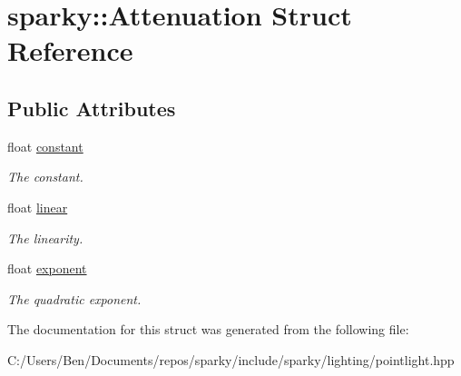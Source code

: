 \hypertarget{structsparky_1_1_attenuation}{}\section{sparky\+:\+:Attenuation Struct Reference}
\label{structsparky_1_1_attenuation}
\subsection*{Public Attributes}
\begin{DoxyCompactItemize}
\item 
float \hyperlink{structsparky_1_1_attenuation_a0bbefcc87e251c6bdbd34f889e2906ce}{constant}\hypertarget{structsparky_1_1_attenuation_a0bbefcc87e251c6bdbd34f889e2906ce}{}\label{structsparky_1_1_attenuation_a0bbefcc87e251c6bdbd34f889e2906ce}

\begin{DoxyCompactList}\small\item\em The constant. \end{DoxyCompactList}\item 
float \hyperlink{structsparky_1_1_attenuation_a2cd5cc43f8b4495b399037a94c30ffea}{linear}\hypertarget{structsparky_1_1_attenuation_a2cd5cc43f8b4495b399037a94c30ffea}{}\label{structsparky_1_1_attenuation_a2cd5cc43f8b4495b399037a94c30ffea}

\begin{DoxyCompactList}\small\item\em The linearity. \end{DoxyCompactList}\item 
float \hyperlink{structsparky_1_1_attenuation_ad2b6be370c7b71c9755903db2506a49f}{exponent}\hypertarget{structsparky_1_1_attenuation_ad2b6be370c7b71c9755903db2506a49f}{}\label{structsparky_1_1_attenuation_ad2b6be370c7b71c9755903db2506a49f}

\begin{DoxyCompactList}\small\item\em The quadratic exponent. \end{DoxyCompactList}\end{DoxyCompactItemize}


The documentation for this struct was generated from the following file\+:\begin{DoxyCompactItemize}
\item 
C\+:/\+Users/\+Ben/\+Documents/repos/sparky/include/sparky/lighting/pointlight.\+hpp\end{DoxyCompactItemize}
